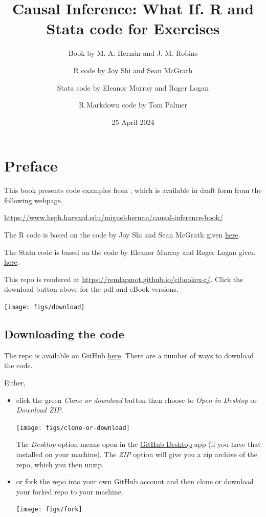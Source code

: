 \documentclass[
  10pt,
  a4paper,
]{book}
\title{Causal Inference: What If. R and Stata code for Exercises}
\author{Book by M. A. Hernán and J. M. Robins \and R code by Joy Shi and Sean McGrath \and Stata code by Eleanor Murray and Roger Logan \and R Markdown code by Tom Palmer}
\date{25 April 2024}
\begin{document}
\maketitle

\thispagestyle{empty}

{
\hypersetup{linkcolor=}
\setcounter{tocdepth}{1}
\tableofcontents
}
\chapter*{Preface}\label{preface}

This book presents code examples from \citet{ci-book}, which is available in draft form from the following webpage.

\url{https://www.hsph.harvard.edu/miguel-hernan/causal-inference-book/}

The R code is based on the code by Joy Shi and Sean McGrath given \href{https://cdn1.sph.harvard.edu/wp-content/uploads/sites/1268/1268/20/Rcode_CIpart2.zip}{here}.

The Stata code is based on the code by Eleanor Murray and Roger Logan given \href{https://cdn1.sph.harvard.edu/wp-content/uploads/sites/1268/2019/11/stata_part2.zip}{here}.

This repo is rendered at \url{https://remlapmot.github.io/cibookex-r/}. Click the download button above for the pdf and eBook versions.

\begin{center}\texttt{[image: figs/download]} \end{center}

\section{Downloading the code}\label{downloading-the-code}

The repo is available on GitHub \href{https://github.com/remlapmot/cibookex-r}{here}. There are a number of ways to download the code.

Either,

\begin{itemize}
\item
  click the green \emph{Clone or download} button then choose to \emph{Open in Desktop} or \emph{Download ZIP}.

  \begin{center}\texttt{[image: figs/clone-or-download]} \end{center}

  The \emph{Desktop} option means open in the \href{https://desktop.github.com/}{GitHub Desktop} app (if you have that installed on your machine). The \emph{ZIP} option will give you a zip archive of the repo, which you then unzip.
\item
  or fork the repo into your own GitHub account and then clone or download your forked repo to your machine.

  \begin{center}\texttt{[image: figs/fork]} \end{center}
\end{itemize}
\end{document}
